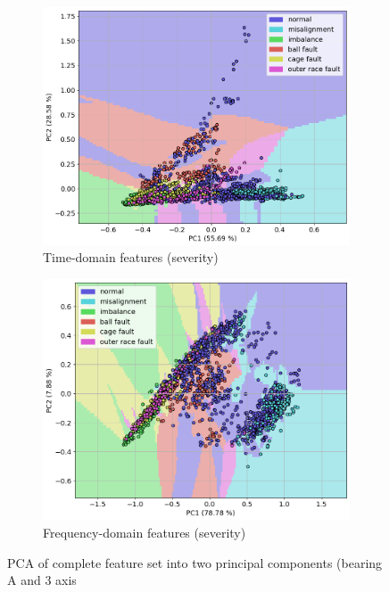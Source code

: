\begin{figure}[h]
\begin{subfigure}[b]{0.48\textwidth}
        \includegraphics[width=\textwidth]{assets/results/labels/PCA-TD-severity.png}
        \caption{Time-domain features (severity)}
    \end{subfigure}
    \hfill
    \begin{subfigure}[b]{0.48\textwidth}
        \includegraphics[width=\textwidth]{assets/results/labels/PCA-FD-severity.png}
        \caption{Frequency-domain features (severity)}
    \end{subfigure} 
    \caption{PCA of complete feature set into two principal components (bearing A and 3 axis}
    \label{fig:design:pca-complete-sets}
\end{figure}

